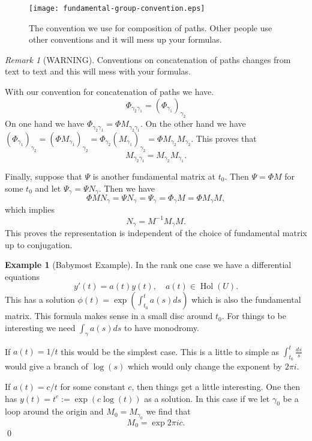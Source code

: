 \documentclass[12pt]{book}
\numberwithin{equation}{section}
\theoremstyle{definition}
\newtheorem{example}[theorem]{Example}
\theoremstyle{remark}
\newtheorem{remark}[theorem]{Remark}
\newcommand{\hol}{\operatorname{Hol}}
\begin{document}
\begin{figure}[h]
\begin{center}
\texttt{[image: fundamental-group-convention.eps]}\label{F:fundamental-group-convention}
\end{center}
\caption{The convention we use for composition of paths. Other people use other conventions and it will mess up your formulas.}
\end{figure}

\begin{remark}[WARNING]
	Conventions on concatenation of paths changes from text to text and this will mess with your formulas.
\end{remark}

With our convention for concatenation of paths we have.
 $$ \Phi_{\gamma_2\gamma_1} = (\Phi_{\gamma_1})_{\gamma_2}$$
On one hand we have $\Phi_{\gamma_2\gamma_1} = \Phi M_{\gamma_2\gamma_1}.$
On the other hand we have $ (\Phi_{\gamma_1})_{\gamma_2}= (\Phi M_{\gamma_1})_{\gamma_2} = \Phi_{\gamma_2} (M_{\gamma_1})_{\gamma_2} = \Phi M_{\gamma_2} M_{\gamma_2}.$
This proves that 
 $$ M_{\gamma_2\gamma_1} = M_{\gamma_2}M_{\gamma_1}.$$

Finally, suppose that $\Psi$ is another fundamental matrix at $t_0$.
Then $\Psi = \Phi M$ for some $t_0$ and let $\Psi_{\gamma} = \Psi N_{\gamma}$. 
Then we have 
 $$\Phi M N_{\gamma} =\Psi N_{\gamma}  =\Psi_{\gamma} = \Phi_{\gamma} M = \Phi M_{\gamma} M, $$
which implies 
 $$ N_{\gamma} = M^{-1} M_{\gamma} M .$$
 This proves the representation is independent of the choice of fundamental matrix up to conjugation.

\begin{example}[Babymost Example]
	In the rank one case we have a differential equations 
	 $$ y'(t) = a(t) y(t), \quad a(t) \in \hol(U). $$
	This has a solution $\phi(t) = \exp( \int_{t_0}^t a(s) ds)$ which is also the fundamental matrix. 
	This formula makes sense in a small disc around $t_0$.
	For things to be interesting we need  $ \int_{\gamma} a(s) ds $ to have monodromy.
	
	If $a(t) = 1/t$ this would be the simplest case. 
	This is a little to simple as $\int_{t_0}^t \frac{ds}{s}$ would give a branch of $\log(s)$ which would only change the exponent by $2\pi i$.
	
	If $a(t) = c/t$ for some constant $c$, then things get a little interesting. 
	One then has $y(t) = t^{c} := \exp( c \log(t))$ as a solution. 
	In this case if we let $\gamma_0$ be a loop around the origin and $M_0 = M_{\gamma_0}$ we find that 
	$$M_{0} = \exp{2 \pi i c}.$$
	\qed
\end{example}
\end{document}
